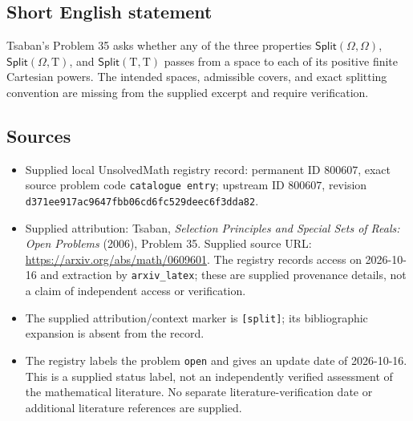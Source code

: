\documentclass[11pt]{article}
\begin{document}
\subsection{Short English statement}
Tsaban's Problem 35 asks whether any of the three properties \(\mathsf{Split}(\Omega,\Omega)\), \(\mathsf{Split}(\Omega,\mathrm T)\), and \(\mathsf{Split}(\mathrm T,\mathrm T)\) passes from a space to each of its positive finite Cartesian powers. The intended spaces, admissible covers, and exact splitting convention are missing from the supplied excerpt and require verification.
\subsection{Sources}
\begin{itemize}
\item Supplied local UnsolvedMath registry record: permanent ID \(800607\), exact source problem code \texttt{catalogue entry}; upstream ID \(800607\), revision \texttt{d371ee917ac9647fbb06cd6fc529deec6f3dda82}.
\item Supplied attribution: Tsaban, \emph{Selection Principles and Special Sets of Reals: Open Problems} (2006), Problem 35. Supplied source URL: \url{https://arxiv.org/abs/math/0609601}. The registry records access on 2026-10-16 and extraction by \texttt{arxiv\_latex}; these are supplied provenance details, not a claim of independent access or verification.
\item The supplied attribution/context marker is \texttt{[split]}; its bibliographic expansion is absent from the record.
\item The registry labels the problem \texttt{open} and gives an update date of 2026-10-16. This is a supplied status label, not an independently verified assessment of the mathematical literature. No separate literature-verification date or additional literature references are supplied.
\end{itemize}
\end{document}
